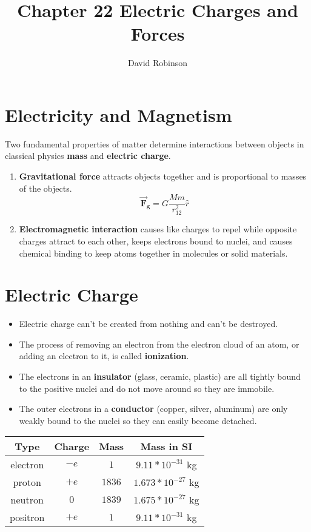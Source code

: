 \documentclass{article}
\title{Chapter 22 Electric Charges and Forces}
\author{David Robinson}
\date{}
\begin{document}
\maketitle

\section*{Electricity and Magnetism}

Two fundamental properties of matter determine interactions between objects in classical physics
\textbf{mass} and \textbf{electric charge}.
\begin{enumerate}
    \item \textbf{Gravitational force} attracts objects together and is proportional to masses of
    the objects.
    \[\mathbf{\vec{F}_g} = G \frac{Mm}{r_{12}^2} \hat{r}\]
    \item \textbf{Electromagnetic interaction} causes like charges to repel while opposite charges
    attract to each other, keeps electrons bound to nuclei, and causes chemical binding to keep
    atoms together in molecules or solid materials.
    
\end{enumerate}
\section*{Electric Charge}

\begin{itemize}
    \item Electric charge can't be created from nothing and can't be destroyed.
    \item The process of removing an electron from the electron cloud of an atom, or adding an
    electron to it, is called \textbf{ionization}.
    \item The electrons in an \textbf{insulator} (glass, ceramic, plastic) are all tightly bound to
    the positive nuclei and do not move around so they are immobile.
    \item The outer electrons in a \textbf{conductor} (copper, silver, aluminum) are only weakly
    bound to the nuclei so they can easily become detached.
\end{itemize}
\begin{center}
\begin{tabular}{|c c c c|} 
    \hline
    Type & Charge & Mass & Mass in SI \\ [0.5ex] 
    \hline
    electron & $-e$ & $1$ & $9.11 * 10^{-31}$ kg \\ 
    \hline
    proton & $+e$ & $1836$ & $1.673 * 10^{-27}$ kg \\
    \hline
    neutron & $0$ & $1839$ & $1.675 * 10^{-27}$ kg \\
    \hline
    positron & $+e$ & $1$ & $9.11 * 10^{-31}$ kg \\
    \hline
\end{tabular}
\end{center}
\end{document}
